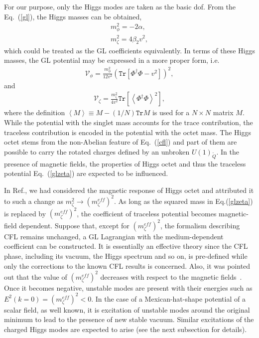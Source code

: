 \documentclass[12pt]{article}
\begin{document}
For our purpose, only the Higgs modes are taken as the basic dof. From the Eq.~(\ref{gl}), the Higgs
masses can be obtained,
\begin{eqnarray}
m_\phi^2=-2\alpha,\\ m_\zeta^2=4\beta_2
	v^2,\label{mhiggs}
\end{eqnarray}
which could be treated as the GL coefficients equivalently. In terms of these Higgs masses, the GL
potential may be expressed in a more proper form, i.e.
\begin{eqnarray}
\mathcal{V}_\phi=
\frac{m_\phi^2}{12v^2}(\texttt{Tr}[\Phi^\dagger\Phi-v^2])^2,
\label{glmphi}
\end{eqnarray}
and
\begin{eqnarray}
\mathcal{V}_\zeta=
\frac{m_\zeta^2}{4v^2}\texttt{Tr}\left[\left<\Phi^\dagger\Phi\right>^2\right],
\label{glzeta}
\end{eqnarray}
where the definition $\left<M\right>\equiv M-(1/N)\texttt{Tr}M$ is used for a $N\times N$ matrix $M$.
While the potential with the singlet mass accounts for the trace contribution, the traceless
contribution is encoded in the potential with the octet mass. The Higgs octet stems from the non-Abelian
feature of Eq.~(\ref{cfl}) and part of them are possible to carry the rotated charges defined by an
unbroken $U(1)_{\widetilde{Q}}$. In the presence of magnetic fields,
the properties of Higgs octet and thus the traceless potential Eq.~(\ref{glzeta}) are expected to
be influenced.

In Ref.\cite{zhang2015magnetic}, we had considered the magnetic response of Higgs octet  and attributed it to such a change as $m_\zeta^2 \rightarrow (m_\zeta^{eff})^2$.
As long as the squared mass in Eq.(\ref{glzeta}) is replaced by $(m_\zeta^{eff})^2$, the coefficient of traceless potential becomes magnetic-field dependent. Suppose that, except for $(m_\zeta^{eff})^2$, the formalism describing CFL remains unchanged, a GL Lagrangian with the medium-dependent coefficient can be constructed. 
It is essentially an effective theory since the CFL phase, including its vacuum, the Higgs spectrum and so on, is pre-defined while only the corrections to the known CFL results is concerned. 
Also, it was pointed out that the value of $(m_\zeta^{eff})^2$ decreases with respect to the magnetic fields~\cite{zhang2015magnetic}. Once it becomes negative, unstable modes are present with their energies such as $E^2(k=0)=(m_\zeta^{eff})^2<0$.
In the case of a Mexican-hat-shape potential of a scalar field, as well known, it is excitation of unstable modes around the original minimum to lead to the presence of new stable vacuum.  
Similar excitations of the charged Higgs modes are expected to arise (see the next subsection for details).
\end{document}
